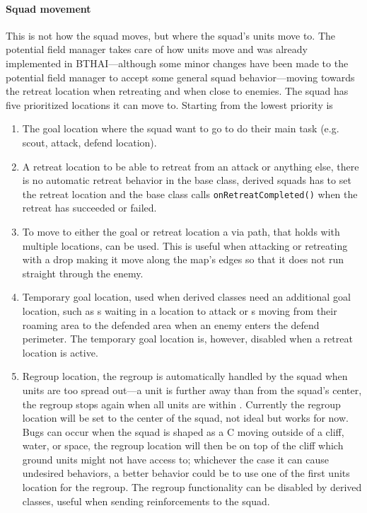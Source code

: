 \paragraph{Squad movement}
This is not how the squad moves, but where the squad's units move to. The potential field manager takes care of how units move and was already implemented in BTHAI\cite{bthai}—although some minor changes have been made to the potential field manager to accept some general squad behavior—moving towards the retreat location when retreating and when close to enemies. The squad has five prioritized locations it can move to. Starting from the lowest priority is
\begin{enumerate}
	\item The goal location where the squad want to go to do their main task (e.g. scout, attack, defend location).
	\item A retreat location to be able to retreat from an attack or anything else, there is no automatic retreat behavior in the base class, derived squads has to set the retreat location and the base class calls \texttt{onRetreatCompleted()} when the retreat has succeeded or failed.
	\item To move to either the goal or retreat location a via path, that holds with multiple locations, can be used. This is useful when attacking or retreating with a drop making it move along the map's edges so that it does not run straight through the enemy.
	\item Temporary goal location, used when derived classes need an additional goal location, such as s waiting in a location to attack or s moving from their roaming area to the defended area when an enemy enters the defend perimeter. The temporary goal location is, however, disabled when a retreat location is active.
	\item Regroup location, the regroup is automatically handled by the squad when units are too spread out—a unit is further away than \squadRegroupDistanceBegin from the squad's center, the regroup stops again when all units are within \squadRegroupDistanceEnd. Currently the regroup location will be set to the center of the squad, not ideal but works for now. Bugs can occur when the squad is shaped as a C moving outside of a cliff, water, or space, the regroup location will then be on top of the cliff which ground units might not have access to; whichever the case it can cause undesired behaviors, a better behavior could be to use one of the first units location for the regroup. The regroup functionality can be disabled by derived classes, useful when sending reinforcements to the squad.
\end{enumerate}

